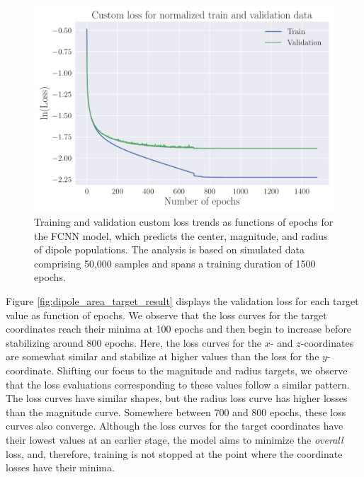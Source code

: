 \documentclass[a4paper, UKenglish, 11pt]{uiomaster}
\begin{document}
\begin{figure}[!htb]
    \centering
    \includegraphics[width=\linewidth]{figures/NN_area/Custom_Loss_area_seed_42_cnn_32_0.001_0.35_0.1_0_1500_(0).pdf}
    \caption{Training and validation custom loss trends as functions of epochs for the FCNN model, which predicts the center, magnitude, and radius of dipole populations. The analysis is based on simulated data comprising 50,000 samples and spans a training duration of 1500 epochs.}
    \label{fig:dipole_area_result}
\end{figure}

Figure \ref{fig:dipole_area_target_result} displays the validation loss for each target value as function of epochs. We observe that the loss curves for the target coordinates reach their minima at 100 epochs and then begin to increase before stabilizing around 800 epochs. Here, the loss curves for the $x$- and $z$-coordinates are somewhat similar and stabilize at higher values than the loss for the $y$-coordinate. Shifting our focus to the magnitude and radius targets, we observe that the loss evaluations corresponding to these values follow a similar pattern. The loss curves have similar shapes, but the radius loss curve has higher losses than the magnitude curve. Somewhere between 700 and 800 epochs, these loss curves also converge. Although the loss curves for the target coordinates have their lowest values at an earlier stage, the model aims to minimize the \emph{overall} loss, and, therefore, training is not stopped at the point where the coordinate losses have their minima.
\end{document}
